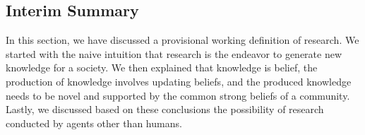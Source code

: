 \documentclass{book}
\begin{document}



\subsection{Interim Summary}
In this section, we have discussed a provisional working definition of research. We started with the naive intuition that research is the endeavor to generate new knowledge for a society. We then explained that knowledge is belief, the production of knowledge involves updating beliefs, and the produced knowledge needs to be novel and supported by the common strong beliefs of a community. Lastly, we discussed based on these conclusions the possibility of research conducted by agents other than humans.
\end{document}
